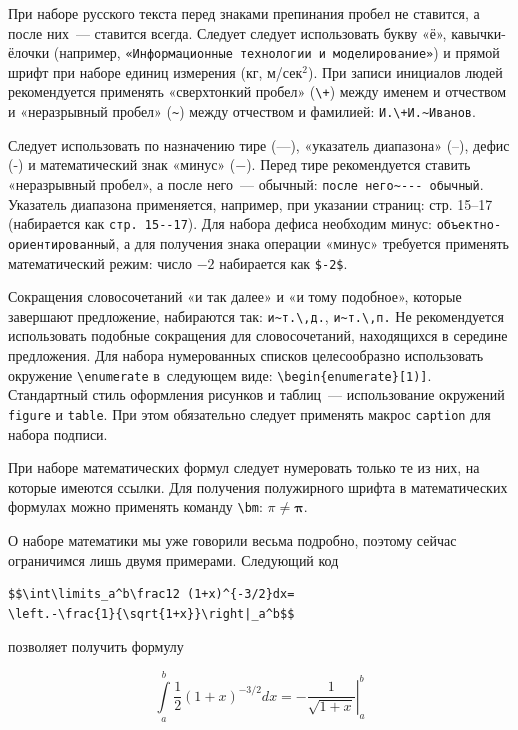 При наборе русского текста перед знаками препинания пробел не ставится, 
а после них~--- ставится всегда. Следует следует использовать букву «ё», 
кавычки-ёлочки 
(например, \verb|«Информационные технологии и моделирование»|) и
прямой шрифт при наборе единиц измерения (кг, м/сек${}^2$).
При записи инициалов людей рекомендуется применять «сверхтонкий пробел» 
(\verb|\+|) между именем и отчеством и «неразрывный пробел» (\verb|~|) между
отчеством и фамилией: \verb|И.\+И.~Иванов|. 

Следует использовать по назначению тире
(---), «указатель диапазона» (--), дефис (-) и математический знак «минус»
($-$). Перед тире рекомендуется ставить «неразрывный
пробел», а после него~--- обычный: \verb|после него~--- обычный|. Указатель
диапазона применяется, например, при указании страниц: стр. 15--17
(набирается как \verb|стр. 15--17|). Для набора дефиса необходим минус: 
\verb|объектно-ориентированный|, а для получения знака операции  «минус»
требуется применять математический режим: число $-2$ набирается как
\verb|$-2$|. 

Сокращения словосочетаний «и так далее» и «и тому подобное», которые
завершают предложение, набираются так: \verb|и~т.\,д.|, \verb|и~т.\,п.|
Не рекомендуется использовать подобные сокращения для словосочетаний,
находящихся в середине предложения. Для набора нумерованных списков 
целесообразно использовать окружение \verb|\enumerate| в~следующем виде:
\verb|\begin{enumerate}[1)]|.
Стандартный стиль оформления рисунков и таблиц~--- использование окружений
\verb|figure| и \verb|table|. При этом обязательно следует применять макрос
\verb|caption| для набора подписи. 

При наборе математических формул следует нумеровать только те из них, на
которые имеются ссылки. Для получения полужирного шрифта в математических
формулах можно применять команду \verb|\bm|: $\pi \ne \bm\pi$.

О наборе математики мы уже говорили весьма подробно, поэтому сейчас 
ограничимся лишь двумя примерами. Следующий код
\begin{small}
\begin{verbatim}
$$\int\limits_a^b\frac12 (1+x)^{-3/2}dx=
\left.-\frac{1}{\sqrt{1+x}}\right|_a^b$$
\end{verbatim}
\end{small}
\noindent позволяет получить формулу

$$\int\limits_a^b\frac12 (1+x)^{-3/2}dx=
\left.-\frac{1}{\sqrt{1+x}}\right|_a^b$$

